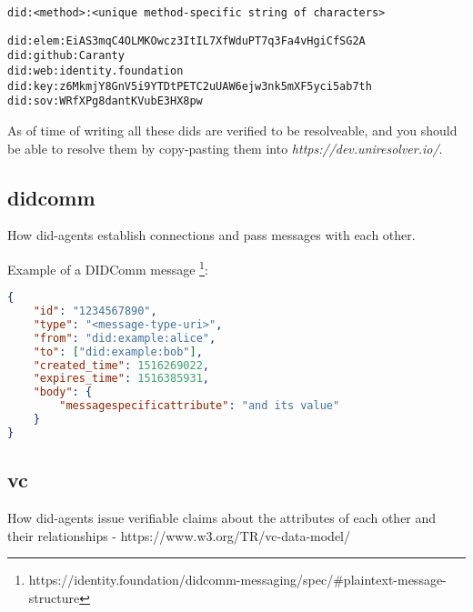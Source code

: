 \begin{lstlisting}[caption={DID-signature}]
did:<method>:<unique method-specific string of characters>
\end{lstlisting}

\begin{lstlisting}[caption={Depending on the DID-method, different DIDs may look very different from each other.}]
did:elem:EiAS3mqC4OLMKOwcz3ItIL7XfWduPT7q3Fa4vHgiCfSG2A
did:github:Caranty
did:web:identity.foundation
did:key:z6MkmjY8GnV5i9YTDtPETC2uUAW6ejw3nk5mXF5yci5ab7th
did:sov:WRfXPg8dantKVubE3HX8pw

\end{lstlisting}

As of time of writing all these \acrshort{dids} are verified to be resolveable, and you should be able to resolve them by copy-pasting them into \textit{https://dev.uniresolver.io/\cite{UniversalResolver}}.

\newpage




\subsection{\acrfull{didcomm}}

How \acrshort{did}-agents establish connections and pass messages with each other.


Example of a DIDComm message \footnote{https://identity.foundation/didcomm-messaging/spec/\#plaintext-message-structure}:
\begin{lstlisting}[language=json]
{
    "id": "1234567890",
    "type": "<message-type-uri>",
    "from": "did:example:alice",
    "to": ["did:example:bob"],
    "created_time": 1516269022,
    "expires_time": 1516385931,
    "body": {
    	"messagespecificattribute": "and its value"
    }
}
\end{lstlisting}

\newpage




\subsection{\acrfull{vc}} 

How \acrshort{did}-agents issue verifiable claims about the attributes of each other and their relationships - https://www.w3.org/TR/vc-data-model/ 

\newpage



